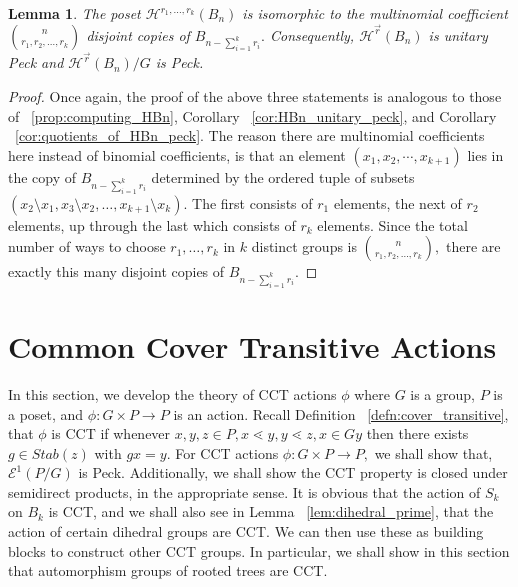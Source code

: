 \documentclass[10 pt]{amsart}
\theoremstyle{plain}
\newtheorem{lem}[thm]{Lemma}
\theoremstyle{definition}
\theoremstyle{remark}
\numberwithin{equation}{section}
\renewcommand{\vec}[1]{\overrightarrow{#1}}
\begin{document}
\begin{lem}
\label{lem:peck_quotients_vector_f}
The poset $\mathcal H^{r_1,\ldots, r_k}(B_n)$ is isomorphic to the multinomial coefficient $\binom n {r_1,r_2,\ldots, r_k}$ disjoint copies of $B_{n- \sum_{i=1}^k r_i}.$ Consequently, $\mathcal H^{\vec r}(B_n)$ is unitary Peck and $\mathcal H^{\vec r}(B_n)/G$ is Peck.
\end{lem}
\begin{proof}
Once again, the proof of the above three statements is analogous to those of ~\ref{prop:computing_HBn}, Corollary ~\ref{cor:HBn_unitary_peck}, and Corollary ~\ref{cor:quotients_of_HBn_peck}. The reason there are multinomial coefficients here instead of binomial coefficients, is that an element $(x_1, x_2, \cdots, x_{k+1})$ lies in the copy of $B_{n -\sum_{i=1}^k r_i}$ determined by the ordered tuple of subsets $(x_2 \setminus x_1,x_3 \setminus x_2, \ldots, x_{k+1} \setminus x_k).$ The first consists of $r_1$ elements, the next of $r_2$ elements, up through the last which consists of $r_k$ elements. Since the total number of ways to choose $r_1,\ldots, r_k$ in $k$ distinct groups is $\binom n {r_1,r_2,\ldots, r_k},$ there are exactly this many disjoint copies of $B_{n- \sum_{i=1}^k r_i}.$
\end{proof}






\section{Common Cover Transitive Actions}
\label{sec:cover_transitive}
In this section, we develop the theory of CCT actions $\phi$ where $G$ is a group, $P$ is a poset, and $\phi:G\times P \rightarrow P$ is an action. Recall Definition ~\ref{defn:cover_transitive}, that $\phi$ is CCT if whenever $x,y,z \in P,x\lessdot y,y\lessdot z,x \in Gy$ then there exists $g \in Stab(z)$ with $gx = y.$ For CCT actions $\phi:G\times P \rightarrow P,$ we shall show that, $\mathcal E^1(P/G)$ is Peck. Additionally, we shall show the CCT property is closed under semidirect products, in the appropriate sense. It is obvious that the action of $S_k$ on $B_k$ is CCT, and we shall also see in Lemma ~\ref{lem:dihedral_prime}, that the action of certain dihedral groups are CCT. We can then use these as building blocks to construct other CCT groups. In particular, we shall show in this section that automorphism groups of rooted trees are CCT.
\end{document}
